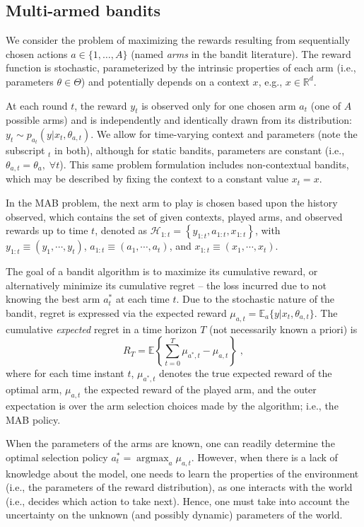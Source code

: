 \documentclass{article}
\def \Real{{\mathbb R}}
\newcommand{\eValue}[1]{\mathbb{E}\left\{ #1 \right\}}
\newcommand{\HH}{\mathcal{H}}
\newcommand{\ie}{i.e., }
\newcommand{\eg}{e.g., }
\newcommand{\argmax}{\mathop{\mathrm{argmax}}}
\begin{document}
\subsection{Multi-armed bandits}
\label{ssec:problem_statement_mab}

We consider the problem of maximizing the rewards resulting from sequentially chosen actions $a\in\{1,\ldots,A\}$ (named \textit{arms} in the bandit literature). The reward function is stochastic, parameterized by the intrinsic properties of each arm (\ie parameters $\theta \in \Theta$) and potentially depends on a context $x$, \eg $x\in \Real^{d}$.

At each round $t$, the reward $y_t$ is observed only for one chosen arm $a_t$ (one of $A$ possible arms) and is independently and identically drawn from its distribution: $y_t\sim p_{a_t}(y|x_t,\theta_{a,t})$. We allow for time-varying context and parameters (note the subscript $_t$ in both), although for static bandits, parameters are constant (\ie $\theta_{a,t}=\theta_a, \; \forall t$). This same problem formulation includes non-contextual bandits, which may be described by fixing the context to a constant value $x_t=x$.

In the MAB problem, the next arm to play is chosen based upon the history observed, which contains the set of given contexts, played arms, and observed rewards up to time $t$, denoted as
$\HH_{1:t}=
  \left\{y_{1:t}, a_{1:t}, x_{1:t}\right\}$, 
  with 
  $y_{1:t} \equiv (y_1, \cdots , y_t)$,
  $a_{1:t} \equiv (a_1, \cdots , a_t)$, and 
  $x_{1:t} \equiv (x_1, \cdots , x_t)$. 

The goal of a bandit algorithm is to maximize its cumulative reward, or alternatively minimize its cumulative regret -- the loss incurred due to not knowing the best arm $a_t^*$ at each time $t$. Due to the stochastic nature of the bandit, regret is expressed via the expected reward $\mu_{a,t}=\mathbb{E}_{a}\{y|x_t,\theta_{a,t}\}$. The cumulative \emph{expected} regret in a time horizon $T$ (not necessarily known a priori) is
\begin{equation}
R_T=\eValue{ \sum_{t=0}^T \mu_{a^*,t}-\mu_{a,t} } \; ,
\label{eq:cumulative_regret}
\end{equation}
where for each time instant $t$, $\mu_{a^*,t}$ denotes the true expected reward of the optimal arm, $\mu_{a,t}$ the expected reward of the played arm, and the outer expectation is over the arm selection choices made by the algorithm; \ie the MAB policy.

When the parameters of the arms are known, one can readily determine the optimal selection policy $a_t^*=\argmax_{a}\mu_{a,t}$. However, when there is a lack of knowledge about the model, one needs to learn the properties of the environment (\ie the parameters of the reward distribution), as one interacts with the world (\ie decides which action to take next). Hence, one must take into account the uncertainty on the unknown (and possibly dynamic) parameters of the world.
\end{document}
